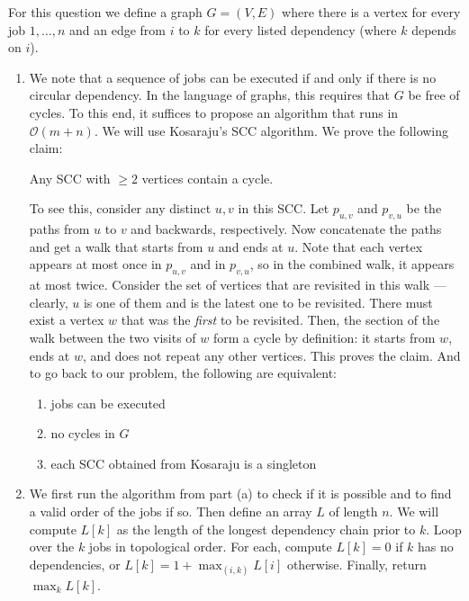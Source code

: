   \begin{solution}
    For this question we define a graph $G = (V, E)$ where there is a vertex for every job $1, \dots, n$ and an edge from $i$ to $k$ for every listed dependency (where $k$ depends on $i$).

    \begin{enumerate}
        \item We note that a sequence of jobs can be executed if and only if there is no circular dependency. In the language of graphs, this requires that $G$ be free of cycles. To this end, it suffices to propose an algorithm that runs in $\mathcal{O}(m+n)$. We will use Kosaraju's SCC algorithm. We prove the following claim:

        \centerline{Any SCC with $\geqslant 2$ vertices contain a cycle.}
                    \vspace{5pt} 
  
        To see this, consider any distinct $u,v$ in this SCC. Let $p_{u,v}$ and $p_{v,u}$ be the paths from $u$ to $v$ and backwards, respectively. Now concatenate the paths and get a walk that starts from $u$ and ends at $u$. Note that each vertex appears at most once in $p_{u,v}$ and in $p_{v,u}$, so in the combined walk, it appears at most twice. Consider the set of vertices that are revisited in this walk --- clearly, $u$ is one of them and is the latest one to be revisited. There must exist a vertex $w$ that was the \textit{first} to be revisited. Then, the section of the walk between the two visits of $w$ form a cycle by definition: it starts from $w$, ends at $w$, and does not repeat any other vertices. This proves the claim. And to go back to our problem, the following are equivalent: 
        \begin{enumerate}
          \item jobs can be executed 
          \item no cycles in $G$ 
          \item each SCC obtained from Kosaraju is a singleton
        \end{enumerate}

        \item We first run the algorithm from part (a) to check if it is possible and to find a valid order of the jobs if so. Then define an array $L$ of length $n$. We will compute $L[k]$ as the length of the longest dependency chain prior to $k$. Loop over the $k$ jobs in topological order. For each, compute $L[k] = 0$ if $k$ has no dependencies, or $L[k] = 1 + \max_{(i, k)} L[i]$ otherwise. Finally, return $\max_{k} L[k]$. 
    \end{enumerate}
  \end{solution}

